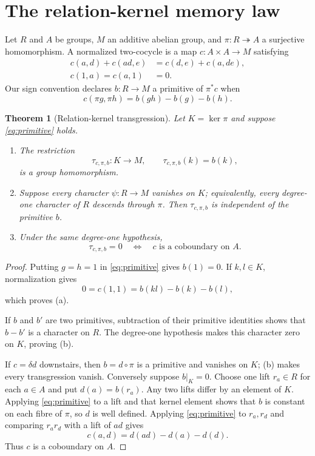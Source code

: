 \documentclass[11pt]{article}
\newtheorem{theorem}{Theorem}[section]
\theoremstyle{definition}
\theoremstyle{remark}
\numberwithin{equation}{section}
\begin{document}
\section{The relation-kernel memory law}

Let $R$ and $A$ be groups, $M$ an additive abelian group, and
$\pi:R\twoheadrightarrow A$ a surjective homomorphism.  A normalized
two-cocycle is a map $c:A\times A\to M$ satisfying
\begin{align}
 c(a,d)+c(ad,e)&=c(d,e)+c(a,de),\label{eq:cocycle}\\
 c(1,a)=c(a,1)&=0.\label{eq:normalized}
\end{align}
Our sign convention declares $b:R\to M$ a primitive of $\pi^*c$ when
\begin{equation}
 c(\pi g,\pi h)=b(gh)-b(g)-b(h).
 \label{eq:primitive}
\end{equation}

\begin{theorem}[Relation-kernel transgression]
\label{thm:kernel-transgression}
Let $K=\ker\pi$ and suppose \eqref{eq:primitive} holds.
\begin{enumerate}[label=(\alph*)]
\item The restriction
\[
                  \tau_{c,\pi,b}:K\longrightarrow M,
                  \qquad \tau_{c,\pi,b}(k)=b(k),
\]
is a group homomorphism.
\item Suppose every character $\psi:R\to M$ vanishes on $K$; equivalently,
every degree-one character of $R$ descends through $\pi$.  Then
$\tau_{c,\pi,b}$ is independent of the primitive $b$.
\item Under the same degree-one hypothesis,
\[
        \tau_{c,\pi,b}=0
        \quad\Longleftrightarrow\quad
        c\text{ is a coboundary on }A.
\]
\end{enumerate}
\end{theorem}

\begin{proof}
Putting $g=h=1$ in \eqref{eq:primitive} gives $b(1)=0$.  If $k,l\in K$,
normalization gives
\[
 0=c(1,1)=b(kl)-b(k)-b(l),
\]
which proves (a).

If $b$ and $b'$ are two primitives, subtraction of their primitive
identities shows that $b-b'$ is a character on $R$.  The degree-one
hypothesis makes this character zero on $K$, proving (b).

If $c=\delta d$ downstairs, then $b=d\circ\pi$ is a primitive and vanishes
on $K$; (b) makes every transgression vanish.  Conversely suppose
$b|_K=0$.  Choose one lift $r_a\in R$ for each $a\in A$ and put
$d(a)=b(r_a)$.  Any two lifts differ by an element of $K$.  Applying
\eqref{eq:primitive} to a lift and that kernel element shows that $b$ is
constant on each fibre of $\pi$, so $d$ is well defined.  Applying
\eqref{eq:primitive} to $r_a,r_d$ and comparing $r_ar_d$ with a lift of
$ad$ gives
\[
                  c(a,d)=d(ad)-d(a)-d(d).
\]
Thus $c$ is a coboundary on $A$.
\end{proof}
\end{document}
